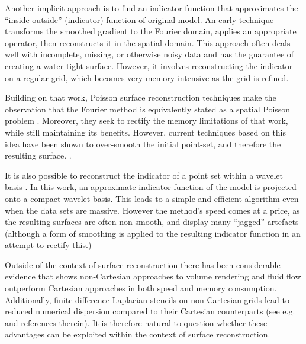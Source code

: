 Another implicit approach is to find an indicator function that approximates the ``inside-outside'' (indicator) function of original model. 
An early technique \cite{fftk} transforms the smoothed gradient to the Fourier domain, applies an appropriate operator, then reconstructs it in the spatial domain. 
This approach often deals well with incomplete, missing, or otherwise noisy data and has the guarantee of creating a water tight surface. 
However, it involves reconstructing the indicator on a regular grid, which becomes very memory intensive as the grid is refined.

Building on that work, Poisson surface reconstruction techniques make the observation that the Fourier method is equivalently stated as a spatial Poisson problem \cite{Kazhdan06,screenedk}. 
Moreover, they seek to rectify the memory limitations of that work, while still maintaining its benefits. However, current techniques based on this idea have been shown to over-smooth the initial point-set, and therefore the resulting surface. \cite{reconbench}.

It is also possible to reconstruct the indicator of a point set within a wavelet basis \cite{wavelet}. 
In this work, an approximate indicator function of the model is projected onto a compact wavelet basis. 
This leads to a simple and efficient algorithm even when the data sets are massive. 
However the method's speed comes at a price, as the resulting surfaces are often non-smooth, and display many ``jagged'' artefacts (although a form of smoothing is applied to the resulting indicator function in an attempt to rectify this.)

Outside of the context of surface reconstruction there has been considerable evidence that shows non-Cartesian approaches to volume rendering \cite{firstbox, practicalbox, hvolrecon} and fluid flow \cite{lboltzman} outperform Cartesian approaches in both speed and memory consumption. 
Additionally, finite difference Laplacian stencils on non-Cartesian grids lead to reduced numerical dispersion compared to their Cartesian  counterparts (see e.g. \cite{hamilton2013, hamilton2013hexagonal} and references therein). 
It is therefore natural to question whether these advantages can be exploited within the context of surface reconstruction.


